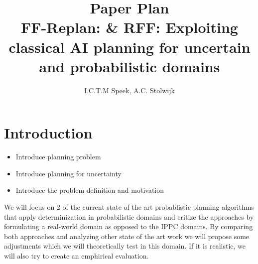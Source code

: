 \documentclass[runningheads,a4paper]{llncs}
\begin{document}
\mainmatter%

\title{Paper Plan\\
FF-Replan: \& RFF\@: Exploiting classical AI planning for uncertain and probabilistic domains}


\author{I.C.T.M Speek, A.C. Stolwijk}

%



\maketitle


\section{Introduction}

\begin{itemize}
	\item Introduce planning problem
	\item Introduce planning for uncertainty
	\item Introduce the problem definition and motivation
\end{itemize}

We will focus on 2 of the current state of the art probablistic planning algorithms that apply determinization
in probabilistic domains and critize the approaches by formulating a real-world domain as opposed to the IPPC domains.
By comparing both approaches and analyzing other state of the art work we will propose some adjustments which we will 
theoretically test in this domain. If it is realistic, we will also try to create an emphirical evaluation.
\end{document}
